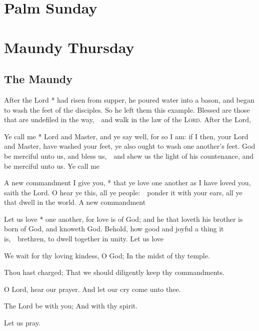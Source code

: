 \section{Palm Sunday}
\section{Maundy Thursday}

\subsection{The Maundy}
\ant After the Lord * had risen from supper, he poured water into a bason, and began to wash the feet of the disciples. So he left them this example.  Blessed are those that are undefiled in the way,\ \star\ and walk in the law of the {\scshape Lord}.  After the Lord, \etc

\ant Ye call me * Lord and Master, and ye say well, for so I am: if I then, your Lord and Master, have washed your feet, ye also ought to wash one another’s feet.  God be merciful unto us, and bless us,\ \star\ and shew us the light of his countenance, and be merciful unto us.  Ye call me \etc

\ant A new commandment I give you, * that ye love one another as I have loved you, saith the Lord.  O hear ye this, all ye people:\ \star\ ponder it with your ears, all ye that dwell in the world.  A new commandment \etc

\ant Let us love * one another, for love is of God; and he that loveth his brother is born of God, and knoweth God.  Behold, how good and joyful a thing it is,\ \star\ brethren, to dwell together in unity.  Let us love \etc

\medskip
\V We wait for thy loving kindess, O God; \R In the midst of thy temple.

\V Thou hast charged; \R That we should diligently keep thy commandments.

\V O Lord, hear our prayer.  \R And let our cry come unto thee.

\V The Lord be with you; \R And with thy spirit.

\centerline{Let us pray.}

